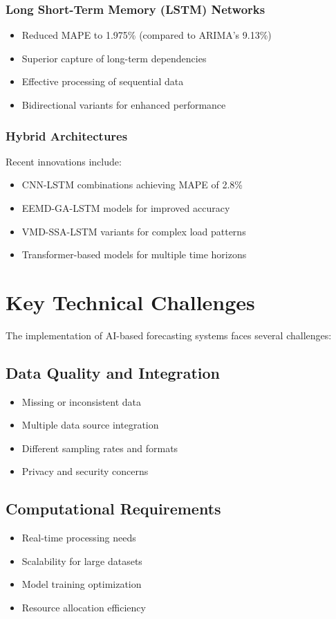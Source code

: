 \documentclass[12pt,a4paper]{report}
\begin{document}
\subsubsection{Long Short-Term Memory (LSTM) Networks}
\begin{itemize}
\item Reduced MAPE to 1.975\% (compared to ARIMA's 9.13\%)
\item Superior capture of long-term dependencies
\item Effective processing of sequential data
\item Bidirectional variants for enhanced performance
\end{itemize}

\subsubsection{Hybrid Architectures}
Recent innovations include:
\begin{itemize}
\item CNN-LSTM combinations achieving MAPE of 2.8\%
\item EEMD-GA-LSTM models for improved accuracy
\item VMD-SSA-LSTM variants for complex load patterns
\item Transformer-based models for multiple time horizons
\end{itemize}

\section{Key Technical Challenges}
The implementation of AI-based forecasting systems faces several challenges:

\subsection{Data Quality and Integration}
\begin{itemize}
\item Missing or inconsistent data
\item Multiple data source integration
\item Different sampling rates and formats
\item Privacy and security concerns
\end{itemize}

\subsection{Computational Requirements}
\begin{itemize}
\item Real-time processing needs
\item Scalability for large datasets
\item Model training optimization
\item Resource allocation efficiency
\end{itemize}
\end{document}
